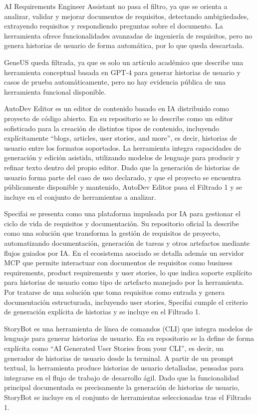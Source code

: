 AI Requirements Engineer Assistant \cite{ai-requirements-engineer-assistant} no pasa el filtro, ya que se orienta a analizar, validar y mejorar documentos de requisitos, detectando ambigüedades, extrayendo requisitos y respondiendo preguntas sobre el documento. La herramienta ofrece funcionalidades avanzadas de ingeniería de requisitos, pero no genera historias de usuario de forma automática, por lo que queda descartada.

GeneUS \cite{geneus} queda filtrada, ya que es solo un artículo académico que describe una herramienta conceptual basada en GPT‑4 para generar historias de usuario y casos de prueba automáticamente, pero no hay evidencia pública de una herramienta funcional disponible.

AutoDev Editor \cite{autodeveditor} es un editor de contenido basado en IA distribuido como proyecto de código abierto. En su repositorio se lo describe como un editor sofisticado para la creación de distintos tipos de contenido, incluyendo explícitamente “blogs, articles, user stories, and more”, es decir, historias de usuario entre los formatos soportados. La herramienta integra capacidades de generación y edición asistida, utilizando modelos de lenguaje para producir y refinar texto dentro del propio editor. Dado que la generación de historias de usuario forma parte del caso de uso declarado, y que el proyecto se encuentra públicamente disponible y mantenido, AutoDev Editor pasa el Filtrado 1 y se incluye en el conjunto de herramientas a analizar.

Specifai \cite{specifai} se presenta como una plataforma impulsada por IA para gestionar el ciclo de vida de requisitos y documentación. Su repositorio oficial la describe como una solución que transforma la gestión de requisitos de proyecto, automatizando documentación, generación de tareas y otros artefactos mediante flujos guiados por IA. En el ecosistema asociado se detalla además un servidor MCP que permite interactuar con documentos de requisitos como business requirements, product requirements y user stories, lo que indica soporte explícito para historias de usuario como tipo de artefacto manejado por la herramienta. Por tratarse de una solución que toma requisitos como entrada y genera documentación estructurada, incluyendo user stories, Specifai cumple el criterio de generación explícita de historias y se incluye en el Filtrado 1.

StoryBot \cite{storybot} es una herramienta de línea de comandos (CLI) que integra modelos de lenguaje para generar historias de usuario. En su repositorio se la define de forma explícita como “AI Generated User Stories from your CLI”, es decir, un generador de historias de usuario desde la terminal. A partir de un prompt textual, la herramienta produce historias de usuario detalladas, pensadas para integrarse en el flujo de trabajo de desarrollo ágil. Dado que la funcionalidad principal documentada es precisamente la generación de historias de usuario, StoryBot se incluye en el conjunto de herramientas seleccionadas tras el Filtrado 1.

